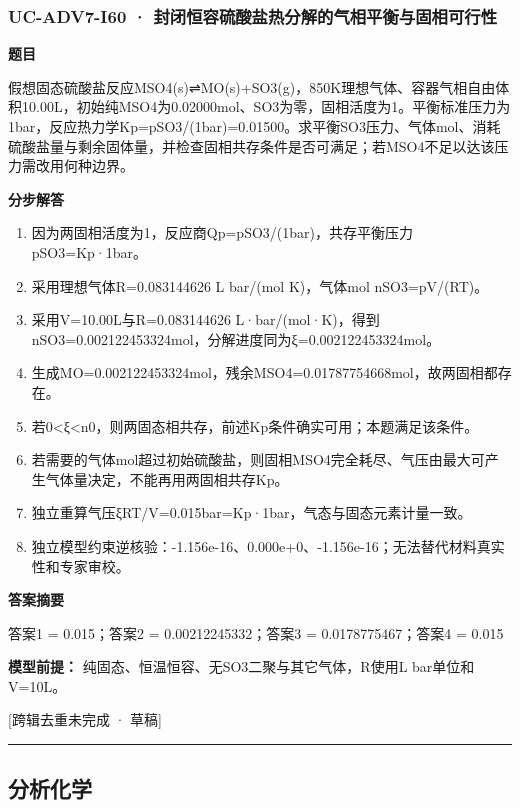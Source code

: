 \documentclass[UTF8,11pt,a4paper]{ctexart}
\begin{document}
\subsubsection*{UC-ADV7-I60 · 封闭恒容硫酸盐热分解的气相平衡与固相可行性}
\noindent\textbf{题目}\par
假想固态硫酸盐反应MSO4(s)⇌MO(s)+SO3(g)，850K理想气体、容器气相自由体积10.00L，初始纯MSO4为0.02000mol、SO3为零，固相活度为1。平衡标准压力为1bar，反应热力学Kp=pSO3/(1bar)=0.01500。求平衡SO3压力、气体mol、消耗硫酸盐量与剩余固体量，并检查固相共存条件是否可满足；若MSO4不足以达该压力需改用何种边界。\par
\medskip\noindent\textbf{分步解答}
\begin{enumerate}
\item 因为两固相活度为1，反应商Qp=pSO3/(1bar)，共存平衡压力pSO3=Kp·1bar。
\item 采用理想气体R=0.083144626 L bar/(mol K)，气体mol nSO3=pV/(RT)。
\item 采用V=10.00L与R=0.083144626 L·bar/(mol·K)，得到nSO3=0.002122453324mol，分解进度同为ξ=0.002122453324mol。
\item 生成MO=0.002122453324mol，残余MSO4=0.01787754668mol，故两固相都存在。
\item 若0<ξ<n0，则两固态相共存，前述Kp条件确实可用；本题满足该条件。
\item 若需要的气体mol超过初始硫酸盐，则固相MSO4完全耗尽、气压由最大可产生气体量决定，不能再用两固相共存Kp。
\item 独立重算气压ξRT/V=0.015bar=Kp·1bar，气态与固态元素计量一致。
\item 独立模型约束逆核验：-1.156e-16、0.000e+0、-1.156e-16；无法替代材料真实性和专家审校。
\end{enumerate}
\noindent\textbf{答案摘要}\par
答案1 = 0.015；答案2 = 0.00212245332；答案3 = 0.0178775467；答案4 = 0.015\par
\noindent\textbf{模型前提：}
纯固态、恒温恒容、无SO3二聚与其它气体，R使用L bar单位和V=10L。\par
\noindent\textcolor{red!65!black}{[跨辑去重未完成 · 草稿]} \par
\medskip\hrule\medskip
\subsection*{分析化学}
\end{document}
